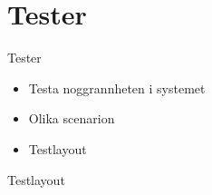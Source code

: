 \section{Tester}

\begin{frame}{Tester}
	\begin{itemize}
		\item Testa noggrannheten i systemet
		\item Olika scenarion
		\item Testlayout
	\end{itemize}
\end{frame}

\begin{frame}{Testlayout}

\end{frame}

